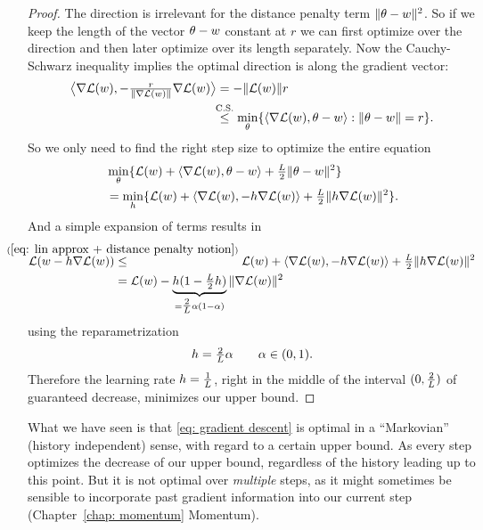\begin{proof}
	The direction is irrelevant for the distance penalty term \(\|\theta-w\|^2\).
	So if we keep the length of the vector \(\theta-w\) constant at \(r\)
	we can first optimize over the direction and then later optimize over its
	length separately. Now the Cauchy-Schwarz inequality implies the optimal
	direction is along the gradient vector:
	\begin{align*}
		\big\langle 
			\nabla\Loss(\weights),
			-\tfrac{r}{\|\nabla\Loss(\weights)\|}\nabla\Loss(\weights)
		\big\rangle
		&= - \|\Loss(\weights)\| r\\
		&\lxle{\text{C.S.}}
		\min_{\theta} \{\langle \nabla \Loss(\weights), \theta-\weights \rangle : \|\theta-\weights\|=r \}.
	\end{align*}
	So we only need to find the right step size to optimize the entire equation
	\begin{align*}
		&\min_{\theta} \{
			\mathcal{L}(w)+ \langle\nabla \mathcal{L}(w), \theta-w\rangle
			+ \tfrac{L}{2}\|\theta-w\|^2 
		\} \\
		&= \min_{h} \{ \mathcal{L}(w) + \langle \nabla \mathcal{L}(w), -h \nabla \mathcal{L}(w)\rangle
		+ \tfrac{L}{2}\|h\nabla \mathcal{L}(w)\|^2\}.
	\end{align*}
	And a simple expansion of terms results in
	\begin{align*}
		\Loss(\weights-\lr\nabla\Loss(\weights))
		&\lxle{(\ref{eq: lin approx + distance penalty notion})}
		\Loss(\weights) + \langle \nabla \Loss(\weights), -\lr \nabla \Loss(\weights)\rangle
		+ \tfrac{\ubound}{2}\|\lr\nabla \Loss(\weights)\|^2\\
		&=\Loss(\weights) - \underbrace{\lr(1-\tfrac{\ubound}2\lr)}_{=\tfrac{2}{\ubound}\alpha(1-\alpha)}\|\nabla\Loss(\weights)\|^2
	\end{align*}
	using the reparametrization
	\begin{align*}
		h=\tfrac{2}{L}\alpha\qquad \alpha \in (0,1).
	\end{align*}
	Therefore the learning rate \(h=\tfrac1{L}\), right in the middle of the
	interval \((0, \tfrac2{L})\) of guaranteed decrease, minimizes our upper bound.
\end{proof}
\begin{remark}
	What we have seen is that \ref{eq: gradient descent} is optimal in a ``Markovian''
	(history independent) sense, with regard to a certain upper bound. As every
	step optimizes the decrease of our upper bound, regardless of the history
	leading up to this point. But it is not optimal over \emph{multiple} steps, as
	it might sometimes be sensible to incorporate past gradient information into
	our current step (Chapter~\ref{chap: momentum} Momentum).
\end{remark}

